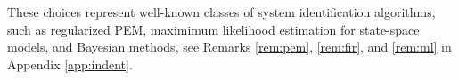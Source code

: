\documentclass{article}
\begin{document}
These choices represent well-known classes of system identification algorithms, such as regularized PEM, 
maximimum likelihood estimation for state-space models, and Bayesian methods, see Remarks \ref{rem:pem}, \ref{rem:fir}, and \ref{rem:ml} in Appendix \ref{app:indent}.


\end{document}
